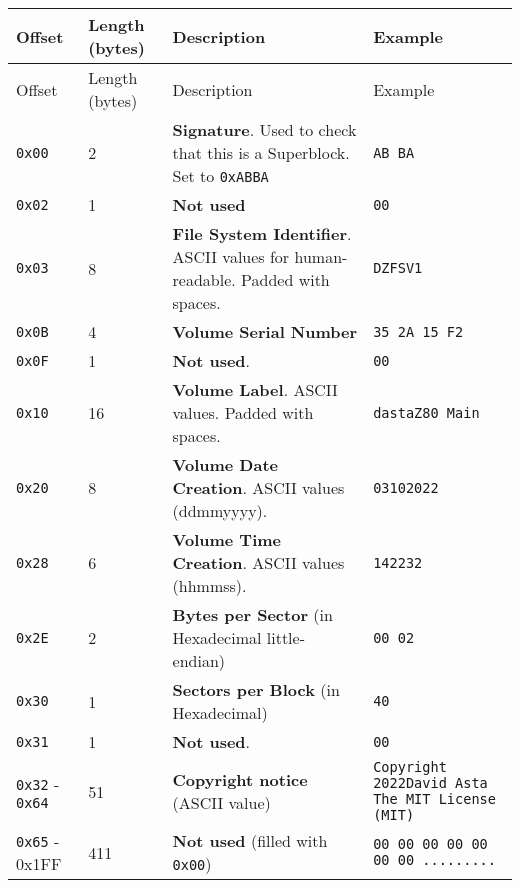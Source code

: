        \begin{longtable}{ |m{2.2cm}|m{1.3cm}|m{6cm}|m{2.7cm}| }
            \hline
            \rowcolor{lightgray}
            Offset & Length (bytes) & Description & Example\\
            \hline
            \endfirsthead

            \hline
            \rowcolor{lightgray}
            Offset & Length (bytes) & Description & Example\\
            \hline
            \endhead

            \texttt{0x00} & 2 & \textbf{Signature}. Used to check that this is a
            Superblock. Set to \texttt{0xABBA} & \texttt{AB BA}\\
            \hline
            \texttt{0x02} & 1 & \textbf{Not used} & \texttt{00}\\
            \hline
            \texttt{0x03} & 8 & \textbf{File System Identifier}. ASCII values
            for human-readable. Padded with spaces. & \texttt{DZFSV1}\\
            \hline
            \texttt{0x0B} & 4 & \textbf{Volume Serial Number} &
            \texttt{35 2A 15 F2}\\
            \hline
            \texttt{0x0F} & 1 & \textbf{Not used}. & \texttt{00}\\
            \hline
            \texttt{0x10} & 16 & \textbf{Volume Label}. ASCII values. Padded
            with spaces. & \texttt{dastaZ80 Main}\\
            \hline
            \texttt{0x20} & 8 & \textbf{Volume Date Creation}. ASCII values
            (ddmmyyyy). & \texttt{03102022}\\
            \hline
            \texttt{0x28} & 6 & \textbf{Volume Time Creation}. ASCII values
            (hhmmss). & \texttt{142232}\\
            \hline
            \texttt{0x2E} & 2 & \textbf{Bytes per Sector} (in Hexadecimal
            little-endian) & \texttt{00 02}\\
            \hline
            \texttt{0x30} & 1 & \textbf{Sectors per Block} (in Hexadecimal) &
            \texttt{40}\\
            \hline
            \texttt{0x31} & 1 & \textbf{Not used}. & \texttt{00}\\
            \hline
            \texttt{0x32} - \texttt{0x64} & 51 & \textbf{Copyright notice}
            (ASCII value) & \texttt{Copyright 2022David Asta The MIT License
            (MIT)}\\
            \hline
            \texttt{0x65} - 0x1FF & 411 & \textbf{Not used} (filled with
            \texttt{0x00}) & \texttt{00 00 00 00 00 00 00 .........}\\
            \hline
        \end{longtable}

